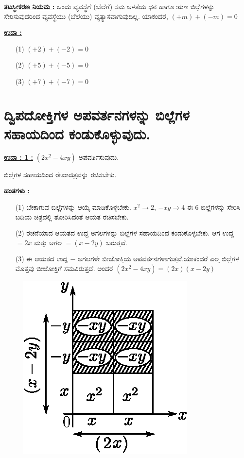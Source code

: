\noindent
{\textbf{\underline{ತಟಸ್ಥೀಕರಣ ನಿಯಮ :}}} ಒಂದು ವ್ಯವಸ್ಥೆಗೆ (ಬೆಲೆಗೆ) ಸಮ ಅಳತೆಯ ಧನ ಹಾಗೂ ಋಣ ಬಿಲ್ಲೆಗಳನ್ನು ಸೇರಿಸುವುದರಿಂದ ವ್ಯವಸ್ಥೆಯು (ಬೆಲೆಯು) ವ್ಯತ್ಯಾಸವಾಗುವುದಿಲ್ಲ. ಯಾಕಂದರೆ, $(+m) + (-m) = 0$

\noindent
{\textbf{\underline{ಉದಾ :}}}
\begin{itemize}
\item [(1)] $(+2) + (-2) = 0$
\item [(2)] $(+5) + (-5) = 0$
\item [(3)] $(+7) + (-7) = 0$
\end{itemize}

\vfill\eject

\section*{ದ್ವಿಪದೋಕ್ತಿಗಳ ಅಪವರ್ತನಗಳನ್ನು ಬಿಲ್ಲೆಗಳ ಸಹಾಯದಿಂದ ಕಂಡುಕೊಳ್ಳುವುದು.}

\noindent
{\textbf{\underline{ಉದಾ : 1 :}}} $(2x^2 - 4xy)$ ಅಪವರ್ತಿಸುವುದು.

ಬಿಲ್ಲೆಗಳ ಸಹಾಯದಿಂದ ರೇಖಾಚಿತ್ರವನ್ನು ರಚಿಸಬೇಕು. 

\noindent
{\textbf{\underline{ಹಂತಗಳು :}}}
\begin{itemize}
\item [(1)] ಬೇಕಾಗುವ ಬಿಲ್ಲೆಗಳನ್ನು ಆಯ್ಕೆ ಮಾಡಿಕೊಳ್ಳಬೇಕು. $x^2 \rightarrow 2$, $-xy \rightarrow 4$ ಈ 6 ಬಿಲ್ಲೆಗಳನ್ನು ಸೇರಿಸಿ ಬದಿಯ ಚಿತ್ರದಲ್ಲಿ ತೋರಿಸಿದಂತೆ ಆಯತ ರಚಿಸಬೇಕು. 
\item [(2)] ರಚನೆಯಾದ ಆಯತದ ಉದ್ದ ಅಗಲಗಳನ್ನು ಬಿಲ್ಲೆಗಳ ಸಹಾಯದಿಂದ ಕಂಡುಕೊಳ್ಳಬೇಕು. ಆಗ ಉದ್ದ $= 2x$ ಮತ್ತು ಅಗಲ $= (x-2y)$ ಬರುತ್ತವೆ. 
\item [(3)] ಈ ಆಯತದ ಉದ್ದ $-$ ಅಗಲಗಳೇ ಬೀಜೋಕ್ತಿಯ ಅಪವರ್ತನಗಳಾಗುತ್ತವೆ.\break ಯಾಕಂದರೆ ಎಲ್ಲ ಬಿಲ್ಲೆಗಳ ಮೊತ್ತವು ಬೀಜೋಕ್ತಿಗೆ ಸಮವಿರುತ್ತದೆ. ಅಂದರೆ $(2x^2 - 4xy) = (2x)(x-2y)$
\end{itemize}
\begin{figure}[H]
\centering
\includegraphics[scale=0.9]{src/figure/chap3/fig3-34b.eps}
\end{figure}

